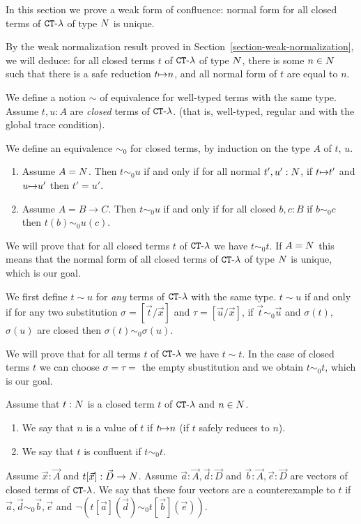 In this section we prove a weak form of confluence: normal form for
all closed terms of ${ {\tt CT} \mbox{-} \lambda}$ of type ${N}$ is unique.

By the weak normalization result proved in Section~\ref{section-weak-normalization},
we will deduce: for all closed terms $t$ of ${ {\tt CT} \mbox{-} \lambda}$ of type ${N}$, 
there is some $n \in {N}$ such that there is a safe reduction $t {\mapsto} n$, and all normal form of $t$
are equal to $n$.

We define a notion $\sim$ of equivalence for well-typed terms with the same type.
Assume $t, u : A$ are \emph{closed} terms of ${ {\tt CT} \mbox{-} \lambda}$.
 (that is, well-typed, regular and with the global trace condition). 

We define an equivalence $\sim_0$ for closed terms,
by induction on the type $A$ of $t$, $u$.

\begin{enumerate}
\item
Assume $A = {N}$. Then $t \sim_0 u$ if and only if for all normal $t',u':{N}$, if $t {\mapsto} t'$
and $u {\mapsto} u'$ then $t'=u'$.
\item
Assume $A = B \rightarrow C$. Then $t \sim_0 u$ if and only if for all closed $b,c:B$ if
$b \sim_0 c$ then $t(b) \sim_0 u(c)$.
\end{enumerate}

We will prove that for all closed terms $t$ of ${ {\tt CT} \mbox{-} \lambda}$ we have $t \sim_0 t$.
If $A={N}$ this means that the normal form of all closed terms of ${ {\tt CT} \mbox{-} \lambda}$ of type ${N}$ is unique,
which is our goal.

We first define $t \sim u$ for \emph{any} terms of ${ {\tt CT} \mbox{-} \lambda}$ with the same type.
 $t \sim u$ if and only if for any two substitution 
$\sigma = [\vec{t} / \vec{x}]$ and $\tau = [\vec{u} / \vec{x}]$,
if $\vec{t} \sim_0 \vec{u}$ and $\sigma(t)$, $\sigma(u)$ are closed then $\sigma(t) \sim_0 \sigma(u)$.

We will prove that  for all terms $t$ of ${ {\tt CT} \mbox{-} \lambda}$ we have $t \sim t$. In the case of closed terms $t$
we can choose $\sigma=\tau=$ the empty sbustitution and we obtain $t \sim_0 t$, which is our goal.

Assume that $t:{N}$ is a closed term $t$ of ${ {\tt CT} \mbox{-} \lambda}$ and $n \in {N}$. 
\begin{enumerate}
\item
We say that $n$ is a value of $t$ if $t {\mapsto} n$ (if $t$ safely reduces to $n$). 
\item
We say that $t$ is confluent if $t \sim_0 t$.
\end{enumerate}
Assume $\vec{x}:\vec{A}$ and $t[\vec{x}]: \vec{D} \rightarrow {N}$. Assume 
$\vec{a}:\vec{A},\vec{d}:\vec{D}$ 
and $\vec{b}:\vec{A},\vec{e}:\vec{D}$ are vectors of closed terms of ${ {\tt CT} \mbox{-} \lambda}$. We say that 
these four vectors are a counterexample to $t$ if $\vec{a},\vec{d} \sim_0 \vec{b},\vec{e}$
and $\neg (t[\vec{a}](\vec{d}) \sim_0  t[\vec{b}](\vec{e}))$.

